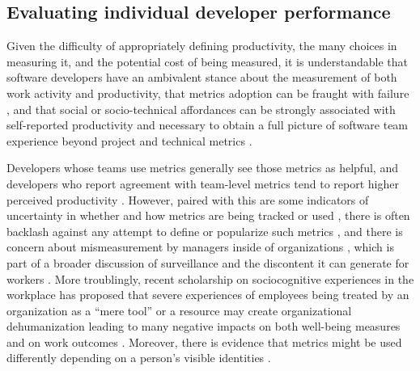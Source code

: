\documentclass[
  sn-mathphys-ay,
]{sn-jnl}
\begin{document}
\subsection{Evaluating individual developer
performance}\label{evaluating-individual-developer-performance}

Given the difficulty of appropriately defining productivity, the many
choices in measuring it, and the potential cost of being measured, it is
understandable that software developers have an ambivalent stance about
the measurement of both work activity and productivity, that metrics
adoption can be fraught with failure
\citep{bouwersSoftwareMetricsPitfalls2013}, and that social or
socio-technical affordances can be strongly associated with
self-reported productivity and necessary to obtain a full picture of
software team experience beyond project and technical metrics
\citep{hicksDeveloperThrivingFour2023, murphy-hillWhatPredictsSoftware2021}.

Developers whose teams use metrics generally see those metrics as
helpful, and developers who report agreement with team-level metrics
tend to report higher perceived productivity
\citep{hicksDeveloperThrivingFour2023, hicksDeveloperThrivingFour2024}.
However, paired with this are some indicators of uncertainty in whether
and how metrics are being tracked or used
\citep{hicksDeveloperThrivingFour2023}, there is often backlash against
any attempt to define or popularize such metrics
\citep{bruneauxWhatMcKinseyHas2024, chhunejaWhy50Developers2024, coteOnlyPeopleWho2023, finster5MinuteDevOps2023, oroszMeasuringDeveloperProductivity2024, oroszMeasuringDeveloperProductivity2024a, rigginsWhatMcKinseyGot2023, terhorst-northMcKinseyDeveloperProductivity2023, terhorst-northWorstProgrammerKnow2023, walkerConsUsingSPACE2023, walkerEverythingWrongDORA2023},
and there is concern about mismeasurement by managers inside of
organizations \citep{hicksDeveloperThrivingFour2023}, which is part of a
broader discussion of surveillance and the discontent it can generate
for workers
\citep{ballWorkplaceSurveillanceOverview2010, grisoldDigitalSurveillanceOrganizations2024, mettlerConnectedWorkplaceCharacteristics2024}.
More troublingly, recent scholarship on sociocognitive experiences in
the workplace has proposed that severe experiences of employees being
treated by an organization as a ``mere tool'' or a resource may create
organizational dehumanization leading to many negative impacts on both
well-being measures and on work outcomes
\citep{caesensPerceivedOrganizationalSupport2017, lagiosExplainingNegativeConsequences2022}.
Moreover, there is evidence that metrics might be used differently
depending on a person's visible identities
\citep[e.g,][]{quadlinMarkWomansRecord2018}.
\end{document}
